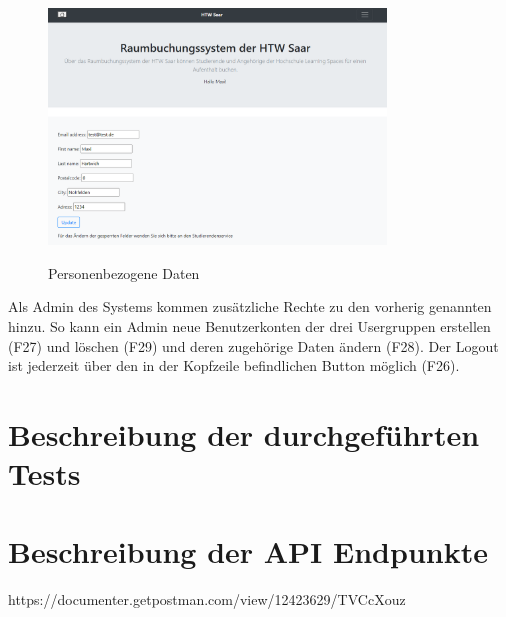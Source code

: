 \documentclass[a4paper,report,headsepline]{scrreprt}
\begin{document}
\begin{figure}[h]
    \centering
    \caption{Personenbezogene Daten}
    \includegraphics[width=0.8\textwidth]{Personenbezogene Daten}
    \label{fig:Personenbezogene Daten}
\end{figure}

Als Admin des Systems kommen zusätzliche Rechte zu den vorherig genannten hinzu. So kann ein Admin neue Benutzerkonten der drei Usergruppen erstellen (F27) und löschen (F29) und deren zugehörige Daten ändern (F28). Der Logout ist jederzeit über den in der Kopfzeile befindlichen Button möglich (F26).

\chapter{Beschreibung der durchgeführten Tests}
\chapter{Beschreibung der API Endpunkte}  
https://documenter.getpostman.com/view/12423629/TVCcXouz      
\end{document}
